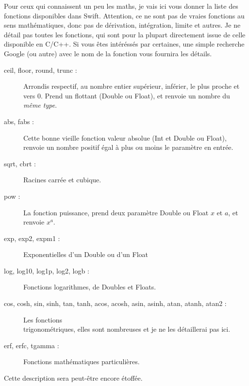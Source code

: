 Pour ceux qui connaissent un peu les maths, je vais ici vous donner la liste des fonctions disponibles dans Swift. Attention, ce ne sont pas de vraies fonctions au sens mathématiques, donc pas de dérivation, intégration, limite et autres.
Je ne détail pas toutes les fonctions, qui sont pour la plupart directement issue de celle disponible en C/C++.
Si vous êtes intéréssés par certaines, une simple recherche Google (ou autre) avec le nom de la fonction vous fournira les détails.
\begin{description}
\item[ceil, floor, round, trunc :]
Arrondis respectif, au nombre entier supérieur, inférier, le plus proche et vers 0. Prend un flottant (Double ou Float), et renvoie un nombre du \emph{même type}.
\item[abs, fabs :]
Cette bonne vieille fonction valeur absolue (Int et Double ou Float), renvoie un nombre positif égal à plus ou moins le paramètre en entrée.
\item[sqrt, cbrt :]
Racines carrée et cubique.
\item[pow :]
La fonction puissance, prend deux paramètre Double ou Float $x$ et $a$, et renvoie $x^{a}$. %
\item[exp, exp2, expm1 :]
Exponentielles d'un Double ou d'un Float
\item[log, log10, log1p, log2, logb :]
Fonctions logarithmes, de Doubles et Floats.
\item[cos, cosh, sin, sinh, tan, tanh, acos, acosh, asin, asinh, atan, atanh, atan2 :]
Les fonctions\\
trigonométriques, elles sont nombreuses et je ne les détaillerai pas ici.
\item[erf, erfc, tgamma :]
Fonctions mathématiques particulières.
\end{description}
Cette description sera peut-être encore étoffée.
